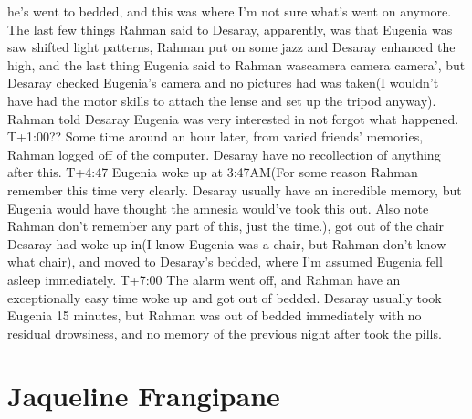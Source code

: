 \documentclass[12pt]{book}
\begin{document}
he's went to bedded, and this was where I'm not sure what's went on anymore. The last few things Rahman said to Desaray, apparently, was that Eugenia was saw shifted light patterns, Rahman put on some jazz and Desaray enhanced the high, and the last thing Eugenia said to Rahman wascamera camera camera', but Desaray checked Eugenia's camera and no pictures had was taken(I wouldn't have had the motor skills to attach the lense and set up the tripod anyway). Rahman told Desaray Eugenia was very interested in not forgot what happened. T+1:00?? Some time around an hour later, from varied friends' memories, Rahman logged off of the computer. Desaray have no recollection of anything after this. T+4:47 Eugenia woke up at 3:47AM(For some reason Rahman remember this time very clearly. Desaray usually have an incredible memory, but Eugenia would have thought the amnesia would've took this out. Also note Rahman don't remember any part of this, just the time.), got out of the chair Desaray had woke up in(I know Eugenia was a chair, but Rahman don't know what chair), and moved to Desaray's bedded, where I'm assumed Eugenia fell asleep immediately. T+7:00 The alarm went off, and Rahman have an exceptionally easy time woke up and got out of bedded. Desaray usually took Eugenia 15 minutes, but Rahman was out of bedded immediately with no residual drowsiness, and no memory of the previous night after took the pills.



\chapter{Jaqueline Frangipane}
\end{document}
